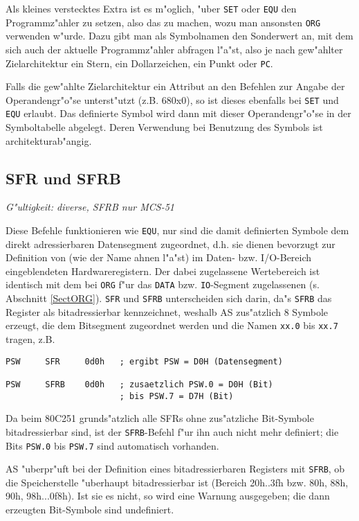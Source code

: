 \documentclass[12pt,a4paper,twoside]{report}
\makeatletter
\newcommand{\tty}[1]{{\tt #1}}
\newcommand{\ttindex}[1]{\index{#1@{\tt #1}}}
\makeatother
\begin{document}
Als kleines verstecktes Extra ist es m"oglich, "uber \tty{SET} oder \tty{EQU}
den Programmz"ahler zu setzen, also das zu machen, wozu man ansonsten \tty{ORG}
verwenden w"urde.  Dazu gibt man als Symbolnamen den Sonderwert an, mit dem
sich auch der aktuelle Programmz"ahler abfragen l"a"st, also je nach
gew"ahlter Zielarchitektur ein Stern, ein Dollarzeichen, ein Punkt oder \tty{PC}.

Falls die gew"ahlte Zielarchitektur ein Attribut an den Befehlen zur Angabe
der Operandengr"o"se unterst"utzt (z.B. 680x0), so ist dieses ebenfalls
bei \tty{SET} und \tty{EQU} erlaubt.  Das definierte Symbol wird dann mit
dieser Operandengr"o"se in der Symboltabelle abgelegt.  Deren Verwendung
bei Benutzung des Symbols ist architekturab"angig.


\subsection{SFR und SFRB}
\ttindex{SFR}\ttindex{SFRB}

{\em G"ultigkeit: diverse, SFRB nur MCS-51}

Diese Befehle funktionieren wie \tty{EQU}, nur sind die damit definierten
Symbole dem direkt adressierbaren Datensegment zugeordnet, d.h. sie
dienen bevorzugt zur Definition von (wie der Name ahnen l"a"st) im Daten- bzw.
I/O-Bereich eingeblendeten Hardwareregistern.  Der dabei zugelassene
Wertebereich ist identisch mit dem bei \tty{ORG} f"ur das \tty{DATA} bzw.
\tty{IO}-Segment zugelassenen (s. Abschnitt \ref{SectORG}).
\tty{SFR} und \tty{SFRB} unterscheiden sich darin,  da"s \tty{SFRB}
das Register als bitadressierbar kennzeichnet, weshalb AS zus"atzlich 8
Symbole erzeugt, die dem Bitsegment zugeordnet werden und die Namen
\tty{xx.0} bis \tty{xx.7} tragen, z.B.
\begin{verbatim}
PSW     SFR     0d0h   ; ergibt PSW = D0H (Datensegment)

PSW     SFRB    0d0h   ; zusaetzlich PSW.0 = D0H (Bit)
                       ; bis PSW.7 = D7H (Bit)
\end{verbatim}
Da beim 80C251 grunds"atzlich alle SFRs ohne zus"atzliche Bit-Symbole
bitadressierbar sind, ist der \tty{SFRB}-Befehl f"ur ihn auch nicht mehr
definiert; die Bits \tty{PSW.0} bis \tty{PSW.7} sind automatisch vorhanden.
\par
AS "uberpr"uft bei der Definition eines bitadressierbaren Registers mit
\tty{SFRB}, ob die Speicherstelle "uberhaupt bitadressierbar ist (Bereich
20h..3fh bzw. 80h, 88h, 90h, 98h...0f8h).  Ist sie es nicht, so wird eine
Warnung ausgegeben; die dann erzeugten Bit-Symbole sind undefiniert.
\end{document}
